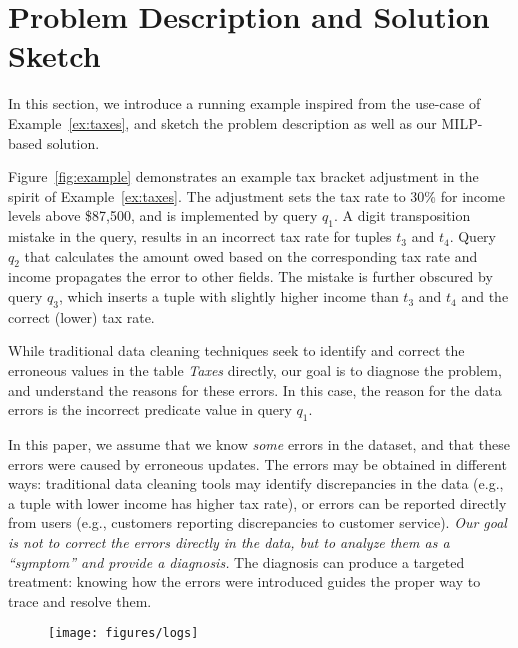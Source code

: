 
\section{Problem Description and Solution Sketch}
\label{sec:abstractions}

In this section, we introduce a running example inspired from the use-case of
Example~\ref{ex:taxes}, and sketch the problem description as well as our
MILP-based solution.



\begin{example}\label{ex:taxes2}
    
Figure~\ref{fig:example} demonstrates an example tax bracket adjustment in the
spirit of Example~\ref{ex:taxes}. The adjustment sets the tax rate to 30\% for
income levels above \$87,500, and is implemented by query $q_1$. A digit
transposition mistake in the query, results in an incorrect tax rate for tuples
$t_3$ and $t_4$. Query $q_2$ that calculates the amount owed based on the corresponding
tax rate and income propagates the error to other fields. The mistake is
further obscured by query $q_3$, which inserts a tuple with slightly higher
income than $t_3$ and $t_4$ and the correct (lower) tax rate.

\end{example}
% 
While traditional data cleaning techniques seek to identify and correct the
erroneous values in the table \emph{Taxes} directly, our goal is to diagnose
the problem, and understand the reasons for these errors. In this case, the
reason for the data errors is the incorrect predicate value in query $q_1$.

In this paper, we assume that we know \emph{some} errors in the dataset, and
that these errors were caused by erroneous updates. The errors may be
obtained in different ways: traditional data cleaning tools may identify
discrepancies in the data (e.g., a tuple with lower income has higher tax
rate), or errors can be reported directly from users (e.g., customers
reporting discrepancies to customer service). \emph{Our goal is not to correct
the errors directly in the data, but to analyze them as a ``symptom'' and provide a
diagnosis.} The diagnosis can produce a targeted treatment: knowing how the
errors were introduced guides the proper way to trace and resolve them.



\begin{figure}[t]
    \centering
        \texttt{[image: figures/logs]}
    \caption{}
    \label{fig:logs}
\end{figure}


